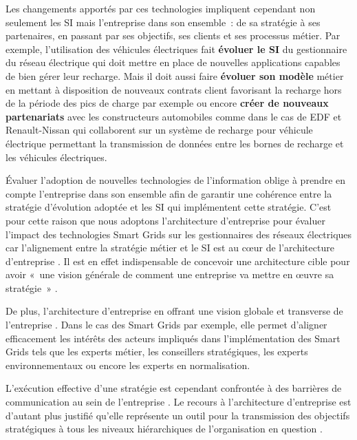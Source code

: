 Les changements apportés par ces technologies impliquent cependant non seulement 
les SI mais l'entreprise dans son ensemble~: de sa stratégie à ses partenaires, 
en passant par ses objectifs, ses clients et ses processus métier. Par exemple, 
l'utilisation des véhicules électriques fait \textbf{évoluer le SI} du gestionnaire du réseau électrique qui doit mettre en place de nouvelles applications capables de 
bien gérer leur recharge. Mais il doit aussi faire 
\textbf{évoluer son modèle} métier en mettant à disposition de nouveaux contrats 
client favorisant la recharge hors de la période des pics de charge par exemple 
ou encore \textbf{créer de nouveaux partenariats} avec les constructeurs 
automobiles comme dans le cas de EDF et Renault-Nissan qui collaborent sur un 
système de recharge pour véhicule électrique permettant la transmission de 
données entre les bornes de recharge et les véhicules électriques.

Évaluer l'adoption de nouvelles technologies de l'information oblige à prendre 
en compte l'entreprise dans son ensemble afin de garantir une cohérence entre 
la stratégie d'évolution adoptée et les SI qui implémentent cette stratégie. 
C'est pour cette raison que nous adoptons l'architecture d'entreprise pour 
évaluer l'impact des technologies Smart Grids sur les gestionnaires des réseaux 
électriques car l'alignement entre la stratégie métier et le SI est au cœur de 
l'architecture d'entreprise \cite{zachman1997enterprise}. Il est en effet indispensable de concevoir une 
architecture cible pour avoir  «~une vision générale de comment une entreprise 
va mettre en œuvre sa stratégie~» \cite{ross2006enterprise}.

De plus, l'architecture d'entreprise en offrant une vision globale et transverse 
de l'entreprise \cite{zachman1987framework}. Dans le cas des Smart Grids par 
exemple, elle permet d'aligner efficacement les intérêts des acteurs impliqués 
dans l'implémentation des Smart Grids tels que les experts métier, les 
conseillers stratégiques, les experts environnementaux ou encore les experts en 
normalisation.

L'exécution effective d'une stratégie est cependant confrontée à des barrières 
de communication au sein de l'entreprise \cite{vcater2010factors}. Le recours à 
l'architecture d'entreprise est d'autant plus justifié qu'elle représente un 
outil pour la transmission des objectifs stratégiques à tous les niveaux 
hiérarchiques de l'organisation en question \cite{kappelman2008enterprise}. 

